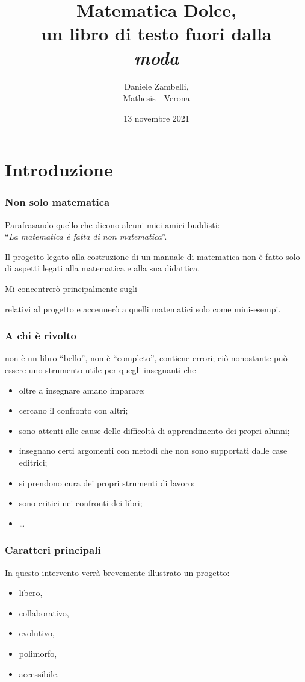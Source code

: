 \documentclass{beamer} %
\title{Matematica Dolce,\\ 
un libro di testo fuori dalla \\
\emph{moda}}
\date{13 novembre 2021}
\author{Daniele Zambelli, \\
Mathesis - Verona
}
\begin{document}
\initslides

\section{Introduzione}

\begin{frame}\frametitle{Non solo matematica}

\begin{flushright}
Parafrasando quello che dicono alcuni miei amici buddisti: \\
``\emph{La matematica è fatta di non matematica}''.
\end{flushright}

Il progetto legato alla costruzione di un manuale di matematica non è 
fatto solo di aspetti legati alla matematica e alla sua didattica. 

\bigskip
\pause
Mi concentrerò principalmente sugli 
\begin{center} \end{center}
relativi al progetto  e accennerò a quelli 
matematici solo come mini-esempi.

\end{frame}


\begin{frame}\frametitle{A chi è rivolto}

\md non è un libro ``bello'', non è ``completo'', contiene errori;
ciò nonostante può essere uno strumento utile per quegli insegnanti che

\bigskip
\begin{itemize} [<+->]
\item oltre a insegnare amano imparare;
\item cercano il confronto con altri;
\item sono attenti alle cause delle difficoltà di apprendimento dei propri 
alunni;
\item insegnano certi argomenti con metodi che non sono supportati dalle case 
editrici;
\item si prendono cura dei propri strumenti di lavoro;
\item sono critici nei confronti dei libri;
\item \dots
\end{itemize}

\end{frame}


\begin{frame}\frametitle{Caratteri principali}

In questo intervento verrà brevemente illustrato un progetto:

\bigskip
\begin{itemize}  %
\item libero,
\item collaborativo,
\item evolutivo,
\item polimorfo,
\item accessibile.
\end{itemize}

\end{frame}
\end{document}
